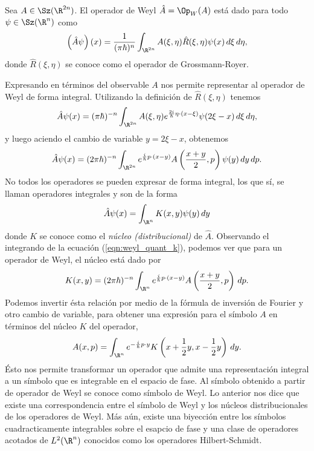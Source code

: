   \begin{definition}
    Sea $A \in \Sz(\R^{2n})$. El operador de Weyl $\hat{A} =
    \Op_W(A)$ está dado para todo $\psi \in \Sz(\R^{n})$ 
    como
    \begin{equation}
      \left( \hat{A}\psi \right)(x)
      = \frac{1}{(\pi\hbar)^{n}} \int_{\R^{2n}}
      A(\xi,\eta)\hat{R}(\xi,\eta)\psi(x) \, d\xi \, d\eta,
    \end{equation}
    donde $\hat{R}(\xi,\eta)$ se conoce como el operador de
    Grossmann-Royer.
  \end{definition}

  Expresando en términos del observable $A$ nos permite
  representar al operador de Weyl de forma integral.
  Utilizando la definición de $\hat{R}(\xi,\eta)$ tenemos
  \[
    \hat{A}\psi(x)
    = (\pi\hbar)^{-n} \int_{\R^{2n}} A(\xi,\eta)
    e^{\frac{2i}{\hbar} \eta \cdot (x - \xi)} \psi(2\xi - x)
    \, d\xi \, d\eta,
  \] 
  y luego aciendo el cambio de variable $y = 2\xi - x$,
  obtenemos
  \begin{equation}
    \label{eqn:weyl_quant_k}
    \hat{A}\psi(x)
    = (2\pi\hbar)^{-n} \int_{\R^{2n}} e^{\frac{i}{\hbar} p
    \cdot (x - y)} A\left( \frac{x+y}{2}, p \right) \psi(y)
    \, dy \, dp.
  \end{equation}
  No todos los operadores se pueden expresar de forma
  integral, los que sí, se llaman operadores integrales y
  son de la forma
  \[
    \hat{A}\psi(x) = \int_{\R^{n}} K(x,y) \psi(y) \, dy
  \] 
  donde $K$ se conoce como el \textit{núcleo
  (distribucional)} de $\hat{A}$. Observando el integrando
  de la ecuación (\ref{eqn:weyl_quant_k}), podemos ver que
  para un operador de Weyl, el núcleo está dado por
  \begin{equation}
    K(x,y)
    = (2\pi\hbar)^{-n} \int_{\R^{n}} e^{\frac{i}{\hbar} p
    \cdot (x - y)}A\left( \frac{x+y}{2}, p \right) \, dp.
  \end{equation}
  Podemos invertir ésta relación por medio de la fórmula de
  inversión de Fourier y otro cambio de variable, para
  obtener una expresión para el símbolo $A$ en términos del
  núcleo $K$ del operador,
  \begin{equation}
    A(x,p)
    = \int_{\R^{n}} e^{-\frac{i}{\hbar} p \cdot y} K\left( x
    + \frac{1}{2}y, x - \frac{1}{2}y\right) \, dy.
  \end{equation}
  Ésto nos permite transformar un operador que admite una
  representación integral a un símbolo que es integrable en
  el espacio de fase. Al símbolo obtenido a partir de
  operador de Weyl se conoce como símbolo de Weyl. Lo
  anterior nos dice que existe una correspondencia entre el
  símbolo de Weyl y los núcleos distribucionales de los
  operadores de Weyl. Más aún, existe una biyección entre
  los símbolos cuadracticamente integrables sobre el esapcio
  de fase y una clase de operadores acotados de
  $L^2(\R^{n})$ conocidos como los operadores
  Hilbert-Schmidt.

